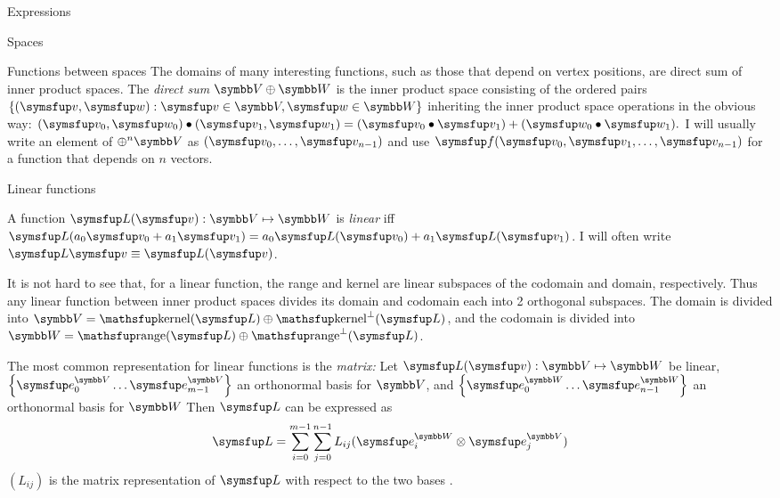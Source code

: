 \documentclass{PalisadesLakesArticle}
\begin{document}
\begin{plSection}{Expressions}
\begin{plSection}{Spaces}
\begin{plSection}{Functions between spaces}
The domains of many interesting functions,
such as those that depend on vertex positions,
are direct sum of inner product spaces.
The \textit{direct sum} $\Space{V} \oplus \Space{W}$ is the inner product space
consisting of the ordered pairs 
$\left\{ (\Vector{v},\Vector{w}) : 
\Vector{v} \in \Space{V}, \Vector{w} \in \Space{W} \right\}$
inheriting the inner product space operations in the obvious way:
$(\Vector{v}_0,\Vector{w}_0) \bullet (\Vector{v}_1,\Vector{w}_1) 
= (\Vector{v}_0 \bullet \Vector{v}_1) 
+ (\Vector{w}_0 \bullet \Vector{w}_1).$
I will usually write an element of $\oplus^n \Space{V}$ as
$(\Vector{v}_0,\ldots,\Vector{v}_{n-1})$
and use
$\Vector{f}(\Vector{v}_0,\Vector{v}_1,\ldots,\Vector{v}_{n-1})$
for a function that depends on $n$ vectors.

\begin{plSection}{Linear functions}
\label{sec:linear-functions}

A function $\Vector{L}(\Vector{v}):\Space{V} \mapsto \Space{W}$
is \textit{linear} iff
$\Vector{L}(a_0 \Vector{v}_0 + a_1 \Vector{v}_1) 
= a_0 \Vector{L}(\Vector{v}_0) + a_1 \Vector{L}(\Vector{v}_1)$.
I will often write
 $\Vector{L}\Vector{v} \equiv \Vector{L}(\Vector{v})$.

It is not hard to see that, for a linear function,
the range and kernel are linear subspaces of the codomain and
domain, respectively.
Thus any linear function between inner product spaces
divides its domain and codomain each into 2 orthogonal subspaces.
The domain is divided into 
$\Space{V} = \kernel(\Vector{L}) \oplus \kernel^{\perp}(\Vector{L})$,
and the codomain is divided into 
$\Space{W} = \range(\Vector{L}) \oplus \range^{\perp}(\Vector{L})$.

The most common representation for linear functions is the \textit{matrix:}
Let $\Vector{L}(\Vector{v}):\Space{V} \mapsto \Space{W}$ be linear,
$\left\{ \Vector{e}_0^{\Space{V}} \ldots  \Vector{e}_{m-1}^{\Space{V}} \right\}$ 
an orthonormal basis for $\Space{V}$,
and
$\left\{ \Vector{e}_0^{\Space{W}} \ldots \Vector{e}_{n-1}^{\Space{W}} \right\}$ 
an orthonormal  basis for $\Space{W}$
Then $\Vector{L}$ can be expressed as
\begin{equation}
\Vector{L}
 =
\sum_{i=0}^{m-1} \sum_{j=0}^{n-1} L_{ij}
 ( \Vector{e}_i^{\Space{W}} \otimes \Vector{e}_j^{\Space{V}} )
\end{equation}
$(L_{ij})$ is the matrix representation of $\Vector{L}$ with respect to
the two bases .


\end{plSection}
\end{plSection}
\end{plSection}
\end{plSection}
\end{document}
